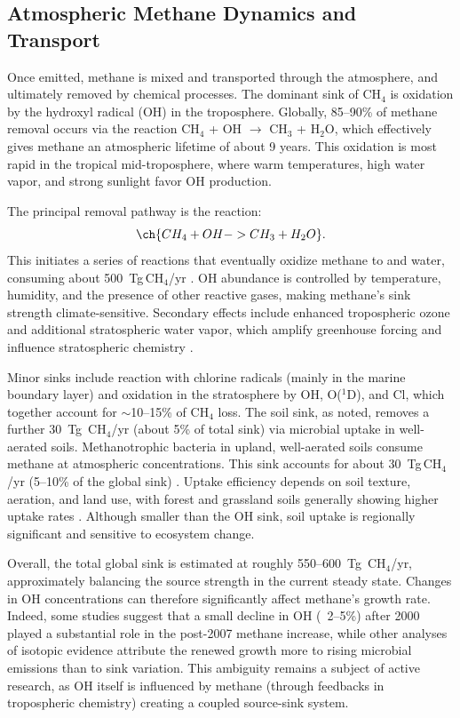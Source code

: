 \subsection{Atmospheric Methane Dynamics and Transport}

Once emitted, methane is mixed and transported through the atmosphere, and ultimately removed by chemical processes. The dominant sink of CH$_4$ is oxidation by the hydroxyl radical (OH) in the troposphere. Globally, 85--90\% of methane removal occurs via the reaction CH$_4$ + OH $\rightarrow$ CH$_3$ + H$_2$O, which effectively gives methane an atmospheric lifetime of about 9 years. This oxidation is most rapid in the tropical mid-troposphere, where warm temperatures, high water vapor, and strong sunlight favor OH production. 

The principal removal pathway is the reaction:
\[ \ch{CH_4 + OH -> CH_3 + H_2O}. \]
This initiates a series of reactions that eventually oxidize methane to  and water, consuming about 500~Tg\,CH$_4$/yr \cite{chen_estimation_2006}. OH abundance is controlled by temperature, humidity, and the presence of other reactive gases, making methane's sink strength climate-sensitive. Secondary effects include enhanced tropospheric ozone and additional stratospheric water vapor, which amplify greenhouse forcing and influence stratospheric chemistry \cite{Etminan2016, Shindell2012}.

Minor sinks include reaction with chlorine radicals (mainly in the marine boundary layer) and oxidation in the stratosphere by OH, O($^1$D), and Cl, which together account for $\sim$10--15\% of CH$_4$ loss. The soil sink, as noted, removes a further 30~Tg~CH$_4$/yr (about 5\% of total sink) via microbial uptake in well-aerated soils. Methanotrophic bacteria in upland, well-aerated soils consume methane at atmospheric concentrations. This sink accounts for about 30~Tg\,CH$_4$/yr (5--10\% of the global sink) \cite{Saunois2020, global_methane_budget}. Uptake efficiency depends on soil texture, aeration, and land use, with forest and grassland soils generally showing higher uptake rates \cite{Serata2023}. Although smaller than the OH sink, soil uptake is regionally significant and sensitive to ecosystem change.

Overall, the total global sink is estimated at roughly 550--600~Tg~CH$_4$/yr, approximately balancing the source strength in the current steady state. Changes in OH concentrations can therefore significantly affect methane's growth rate. Indeed, some studies suggest that a small decline in OH (~2--5\%) after 2000 played a substantial role in the post-2007 methane increase, while other analyses of isotopic evidence attribute the renewed growth more to rising microbial emissions than to sink variation. This ambiguity remains a subject of active research, as OH itself is influenced by methane (through feedbacks in tropospheric chemistry) creating a coupled source-sink system.

